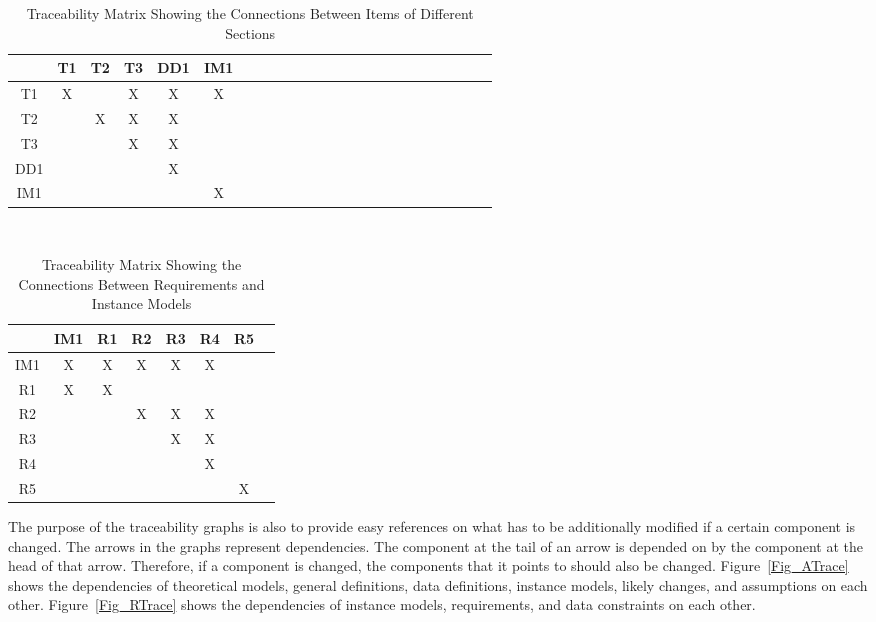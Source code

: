 \documentclass[12pt]{article}
\begin{document}
\begin{table}[h!]
\centering
\begin{tabular}{|c|c|c|c|c|c|c|c|c|c|c|c|c|c|c|c|c|c|c|c|c|c|c|c|}
\hline        
	& T1& T2& T3& DD1& IM1  \\
\hline
T1     &X & &X &X &X    \\ \hline
T2     & &X &X &X &   \\ \hline
T3     & & &X &X &   \\ \hline
DD1    & & & &X &  \\ \hline
IM1    & & & & &X  \\ 

\hline
\end{tabular}\\
\caption{Traceability Matrix Showing the Connections Between Items of Different 
Sections}
\label{Table:trace}
\end{table}


\begin{table}[h!]
\centering
\begin{tabular}{|c|c|c|c|c|c|c|c|}
\hline
	& IM1& R1& R2& R3& R4& R5 \\
\hline
IM1           &X &X &X &X &X &  \\ \hline
R1            &X &X & & & &  \\ \hline
R2            & & &X &X &X &  \\ \hline
R3            & & & &X &X &  \\ \hline
R4            & & & & &X &  \\ \hline 
R5            & & & & & &X  \\ 
\hline
\end{tabular}
\caption{Traceability Matrix Showing the Connections Between Requirements and Instance Models}
\label{Table:R_trace}
\end{table}

The purpose of the traceability graphs is also to provide easy references on
what has to be additionally modified if a certain component is changed.  The
arrows in the graphs represent dependencies. The component at the tail of an
arrow is depended on by the component at the head of that arrow. Therefore, if a
component is changed, the components that it points to should also be
changed. Figure~\ref{Fig_ATrace} shows the dependencies of theoretical models,
general definitions, data definitions, instance models, likely changes, and
assumptions on each other. Figure~\ref{Fig_RTrace} shows the dependencies of
instance models, requirements, and data constraints on each other.
\end{document}
